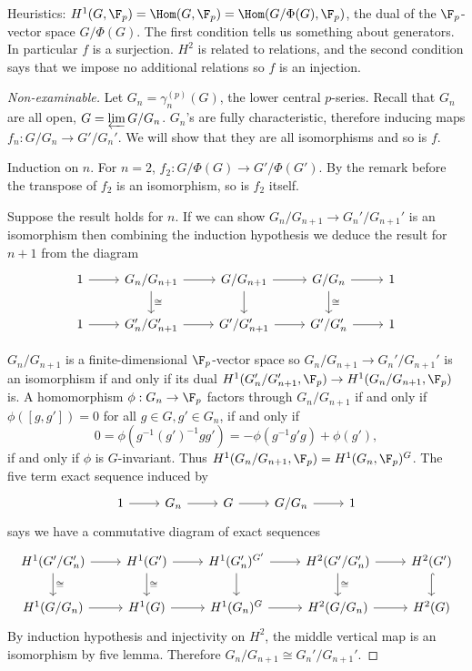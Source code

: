 \documentclass[a4paper]{article}
\begin{document}
Heuristics: \(H^1(G, \F_p) = \Hom(G, \F_p) = \Hom(G/\Phi(G), \F_p)\), the dual of the \(\F_p\)-vector space \(G/\Phi(G)\). The first condition tells us something about generators. In particular \(f\) is a surjection. \(H^2\) is related to relations, and the second condition says that we impose no additional relations so \(f\) is an injection.

\begin{proof}[Non-examinable]
  Let \(G_n = \gamma_n^{(p)}(G)\), the lower central \(p\)-series. Recall that \(G_n\) are all open, \(G = \varprojlim G/G_n\). \(G_n\)'s are fully characteristic, therefore inducing maps \(f_n: G/G_n \to G'/G_n'\). We will show that they are all isomorphisms and so is \(f\).

  Induction on \(n\). For \(n = 2\), \(f_2: G/\Phi(G) \to G'/\Phi(G')\). By the remark before the transpose of \(f_2\) is an isomorphism, so is \(f_2\) itself.

  Suppose the result holds for \(n\). If we can show \(G_n/G_{n + 1} \to G_n'/G_{n + 1}'\) is an isomorphism then combining the induction hypothesis we deduce the result for \(n + 1\) from the diagram
  \[
    \begin{tikzcd}
      1 \ar[r] & G_n/G_{n + 1} \ar[r] \ar[d, "\cong"] & G/G_{n + 1} \ar[r] \ar[d] & G/G_n \ar[r] \ar[d, "\cong"] & 1 \\
      1 \ar[r] & G_n'/G_{n + 1}' \ar[r] & G'/G_{n + 1}' \ar[r] & G'/G_n' \ar[r] & 1
    \end{tikzcd}
  \]

  \(G_n/G_{n + 1}\) is a finite-dimensional \(\F_p\)-vector space so \(G_n/G_{n + 1} \to G_n'/G_{n + 1}'\) is an isomorphism if and only if its dual \(H^1(G_n'/G_{n + 1}', \F_p) \to H^1(G_n/G_{n + 1}, \F_p)\) is. A homomorphism \(\phi: G_n \to \F_p\) factors through \(G_n/G_{n + 1}\) if and only if \(\phi([g, g']) = 0\) for all \(g \in G, g' \in G_n\), if and only if
  \[
    0 = \phi(g^{-1}(g')^{-1}gg') = - \phi(g^{-1}g'g) + \phi(g'),
  \]
  if and only if \(\phi\) is \(G\)-invariant. Thus \(H^1(G_n/G_{n + 1}, \F_p) = H^1(G_n, \F_p)^G\). The five term exact sequence induced by
  \[
    \begin{tikzcd}
      1 \ar[r] & G_n \ar[r] & G \ar[r] & G/G_n \ar[r] & 1
    \end{tikzcd}
  \]
  says we have a commutative diagram of exact sequences
  \[
    \begin{tikzcd}
      H^1(G'/G'_n) \ar[r] \ar[d, "\cong"] & H^1(G') \ar[r] \ar[d, "\cong"] & H^1(G'_n)^{G'} \ar[r] \ar[d] & H^2(G'/G'_n) \ar[r] \ar[d, "\cong"] & H^2(G') \ar[d, hook] \\
      H^1(G/G_n) \ar[r] & H^1(G) \ar[r] & H^1(G_n)^G \ar[r] & H^2(G/G_n) \ar[r] & H^2(G)
    \end{tikzcd}
  \]
  By induction hypothesis and injectivity on \(H^2\), the middle vertical map is an isomorphism by five lemma. Therefore \(G_n/G_{n + 1} \cong G_n'/G_{n + 1}'\).
\end{proof}
\end{document}
